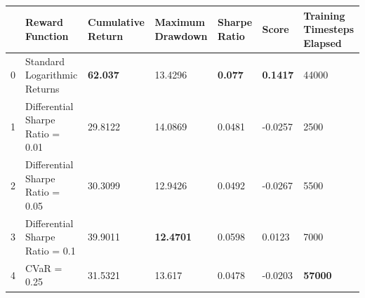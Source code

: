 \begin{tabular}{lllllll}
\toprule
 & Reward Function & Cumulative Return & Maximum Drawdown & Sharpe Ratio & Score & Training Timesteps Elapsed \\
\midrule
0 & Standard Logarithmic Returns & \textbf{62.037} & 13.4296 & \textbf{0.077} & \textbf{0.1417} & 44000 \\
1 & Differential Sharpe Ratio = 0.01 & 29.8122 & 14.0869 & 0.0481 & -0.0257 & 2500 \\
2 & Differential Sharpe Ratio = 0.05 & 30.3099 & 12.9426 & 0.0492 & -0.0267 & 5500 \\
3 & Differential Sharpe Ratio = 0.1 & 39.9011 & \textbf{12.4701} & 0.0598 & 0.0123 & 7000 \\
4 & CVaR = 0.25 & 31.5321 & 13.617 & 0.0478 & -0.0203 & \textbf{57000} \\
\bottomrule
\end{tabular}

